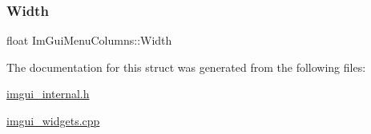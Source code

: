 \mbox{\label{struct_im_gui_menu_columns_a3cca7e65a4625a41a4b9c59c1aaea15d}} 
\subsubsection{\texorpdfstring{Width}{Width}}
{\footnotesize\ttfamily float Im\+Gui\+Menu\+Columns\+::\+Width}



The documentation for this struct was generated from the following files\+:\begin{DoxyCompactItemize}
\item 
\mbox{\hyperlink{imgui__internal_8h}{imgui\+\_\+internal.\+h}}\item 
\mbox{\hyperlink{imgui__widgets_8cpp}{imgui\+\_\+widgets.\+cpp}}\end{DoxyCompactItemize}
